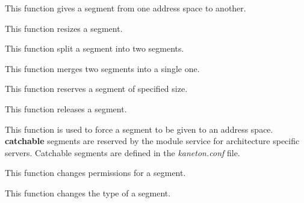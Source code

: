 	  {This function gives a segment from one address space to another.}

	  {This function resizes a segment.}

	  {This function split a segment into two segments.}

	  {This function merges two segments into a single one.}

	  {This function reserves a segment of specified size.}

	  {This function releases a segment.}

	  {This function is used to force a segment to be given to an address
	    space. \textbf{catchable} segments are reserved by the module
	    service for architecture specific servers. Catchable segments
	    are defined in the \textit{kaneton.conf} file.}

	  {This function changes permissions for a segment.}

	  {This function changes the type of a segment.}

